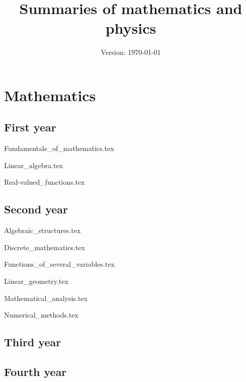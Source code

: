 \documentclass{report}
\title{Summaries of mathematics and physics}
\author{}
\date{Version: \today}
\begin{document}
\maketitle
\newpage
\tableofcontents
\newpage
\part{Mathematics}
    \chapter{First year}
    \newpage
        {Fundamentals_of_mathematics.tex}
        \cleardoublepage    
    
        {Linear_algebra.tex}
        \cleardoublepage
        
        {Real-valued_functions.tex}
        \cleardoublepage
    \chapter{Second year}
    \newpage
        {Algebraic_structures.tex}
        \cleardoublepage
        
        {Discrete_mathematics.tex}
        \cleardoublepage
        
        {Functions_of_several_variables.tex}
        \cleardoublepage
        
        {Linear_geometry.tex}
        \cleardoublepage
        
        {Mathematical_analysis.tex}
        \cleardoublepage
        
        {Numerical_methods.tex}
        \cleardoublepage
    \chapter{Third year}
    \newpage
        
    \chapter{Fourth year}
    \newpage
        
\end{document}
